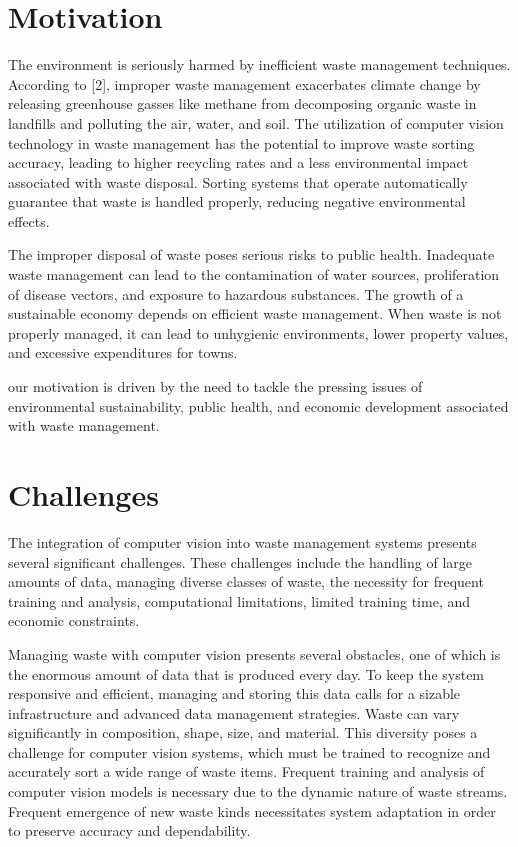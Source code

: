 \section{Motivation}
The environment is seriously harmed by inefficient waste management techniques. According to [2], improper waste management exacerbates climate change by releasing greenhouse gasses like methane from decomposing organic waste in landfills and polluting the air, water, and soil. The utilization of computer vision technology in waste management has the potential to improve waste sorting accuracy, leading to higher recycling rates and a less environmental impact associated with waste disposal. Sorting systems that operate automatically guarantee that waste is handled properly, reducing negative environmental effects.

The improper disposal of waste poses serious risks to public health. Inadequate waste management can lead to the contamination of water sources, proliferation of disease vectors, and exposure to hazardous substances. The growth of a sustainable economy depends on efficient waste management. When waste is not properly managed, it can lead to unhygienic environments, lower property values, and excessive expenditures for towns. 

our motivation is driven by the need to tackle the pressing issues of environmental sustainability, public health, and economic development associated with waste management.

\section{Challenges}
The integration of computer vision into waste management systems presents several significant challenges. These challenges include the handling of large amounts of data, managing diverse classes of waste, the necessity for frequent training and analysis, computational limitations, limited training time, and economic constraints.

Managing waste with computer vision presents several obstacles, one of which is the enormous amount of data that is produced every day. To keep the system responsive and efficient, managing and storing this data calls for a sizable infrastructure and advanced data management strategies. Waste can vary significantly in composition, shape, size, and material. This diversity poses a challenge for computer vision systems, which must be trained to recognize and accurately sort a wide range of waste items. Frequent training and analysis of computer vision models is necessary due to the dynamic nature of waste streams. Frequent emergence of new waste kinds necessitates system adaptation in order to preserve accuracy and dependability.

